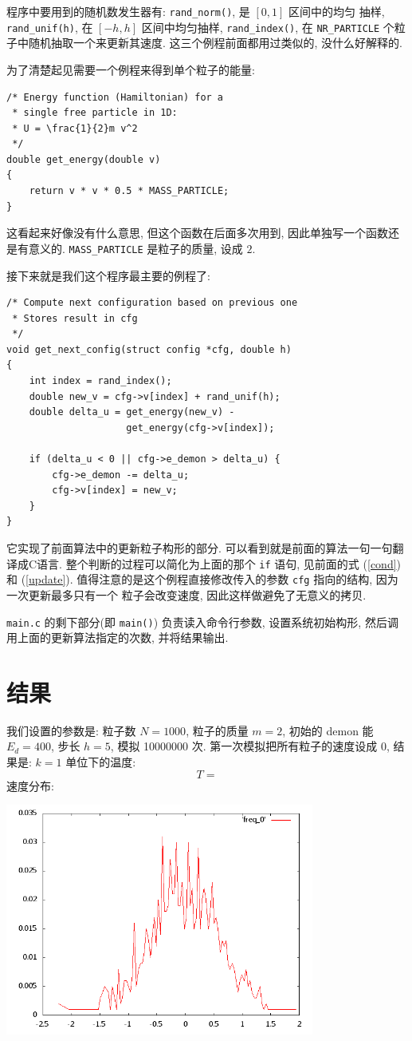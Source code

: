 \documentclass{ctexart}
\begin{document}
程序中要用到的随机数发生器有: \verb|rand_norm()|, 是 $[0,1]$ 区间中的均匀
抽样, \verb|rand_unif(h)|, 在 $[-h,h]$ 区间中均匀抽样, \verb|rand_index()|,
在 \verb|NR_PARTICLE| 个粒子中随机抽取一个来更新其速度. 这三个例程前面都用过类似的,
没什么好解释的.

为了清楚起见需要一个例程来得到单个粒子的能量:
\begin{verbatim}
/* Energy function (Hamiltonian) for a
 * single free particle in 1D:
 * U = \frac{1}{2}m v^2
 */
double get_energy(double v)
{
    return v * v * 0.5 * MASS_PARTICLE;
}
\end{verbatim}
这看起来好像没有什么意思, 但这个函数在后面多次用到, 因此单独写一个函数还是有意义的.
\verb|MASS_PARTICLE| 是粒子的质量, 设成 $2$.

接下来就是我们这个程序最主要的例程了:
\begin{verbatim}
/* Compute next configuration based on previous one
 * Stores result in cfg
 */
void get_next_config(struct config *cfg, double h)
{
    int index = rand_index();
    double new_v = cfg->v[index] + rand_unif(h);
    double delta_u = get_energy(new_v) -
                     get_energy(cfg->v[index]);

    if (delta_u < 0 || cfg->e_demon > delta_u) {
        cfg->e_demon -= delta_u;
        cfg->v[index] = new_v;
    }
}
\end{verbatim}
它实现了前面算法中的更新粒子构形的部分. 可以看到就是前面的算法一句一句翻译成C语言.
整个判断的过程可以简化为上面的那个 \verb|if| 语句, 见前面的式 (\ref{cond}) 和
(\ref{update}).
值得注意的是这个例程直接修改传入的参数 \verb|cfg| 指向的结构, 因为一次更新最多只有一个
粒子会改变速度, 因此这样做避免了无意义的拷贝.

\verb|main.c| 的剩下部分(即 \verb|main()|) 负责读入命令行参数, 设置系统初始构形,
然后调用上面的更新算法指定的次数, 并将结果输出.

\section{结果}
我们设置的参数是: 粒子数 $N = 1000$, 粒子的质量 $m=2$, 初始的 demon 能 $E_d = 400$,
步长 $h=5$, 模拟 10000000 次. 第一次模拟把所有粒子的速度设成 0, 结果是:
$k=1$ 单位下的温度:
\[
T = 
\]
速度分布:
\begin{center}
\includegraphics[width=4in]{freq_0.png}
\end{center}
\end{document}
